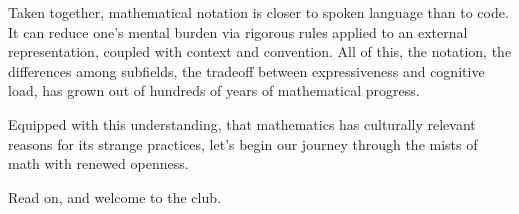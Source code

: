 Taken together, mathematical notation is closer to spoken language than to
code. It can reduce one's mental burden via rigorous rules applied to an
external representation, coupled with context and convention. All of this, the
notation, the differences among subfields, the tradeoff between expressiveness
and cognitive load, has grown out of hundreds of years of mathematical
progress.

Equipped with this understanding, that mathematics has culturally relevant
reasons for its strange practices, let's begin our journey through the mists of
math with renewed openness.

Read on, and welcome to the club.
